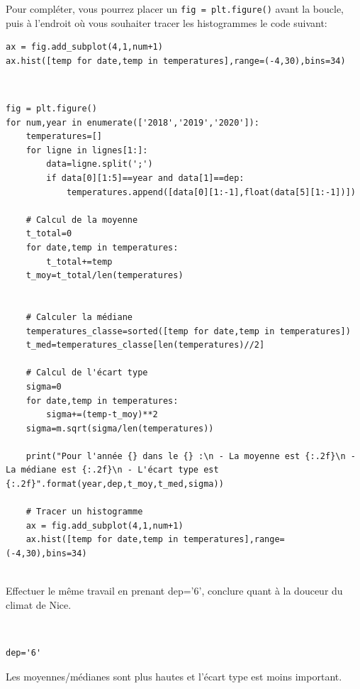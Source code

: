 Pour compléter, vous pourrez placer un \verb?fig = plt.figure()? avant la boucle, puis à l'endroit où vous souhaiter tracer les histogrammes le code suivant:
\begin{verbatim}
ax = fig.add_subplot(4,1,num+1)
ax.hist([temp for date,temp in temperatures],range=(-4,30),bins=34)
\end{verbatim}

\begin{solution}~\ \\
\begin{verbatim}
fig = plt.figure()
for num,year in enumerate(['2018','2019','2020']):
    temperatures=[]
    for ligne in lignes[1:]:
        data=ligne.split(';')
        if data[0][1:5]==year and data[1]==dep:
            temperatures.append([data[0][1:-1],float(data[5][1:-1])])

    # Calcul de la moyenne
    t_total=0
    for date,temp in temperatures:
        t_total+=temp
    t_moy=t_total/len(temperatures)

    
    # Calculer la médiane
    temperatures_classe=sorted([temp for date,temp in temperatures])
    t_med=temperatures_classe[len(temperatures)//2]

    # Calcul de l'écart type
    sigma=0
    for date,temp in temperatures:
        sigma+=(temp-t_moy)**2
    sigma=m.sqrt(sigma/len(temperatures))

    print("Pour l'année {} dans le {} :\n - La moyenne est {:.2f}\n - La médiane est {:.2f}\n - L'écart type est {:.2f}".format(year,dep,t_moy,t_med,sigma))

    # Tracer un histogramme
    ax = fig.add_subplot(4,1,num+1)
    ax.hist([temp for date,temp in temperatures],range=(-4,30),bins=34)
\end{verbatim}
\end{solution}

\begin{exercice}~\\
Effectuer le même travail en prenant dep='6', conclure quant à la douceur du climat de Nice.
\end{exercice}

\begin{solution}~\ \\
\begin{verbatim}
dep='6'
\end{verbatim}
Les moyennes/médianes sont plus hautes et l'écart type est moins important.
\end{solution}



